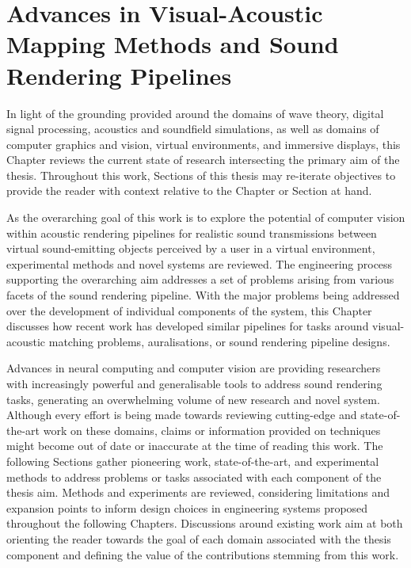 \chapter{Advances in Visual-Acoustic Mapping Methods and Sound Rendering Pipelines}\label{ch:litReview}%
In light of the grounding provided around the domains of wave theory, digital signal processing, acoustics and soundfield simulations, as well as domains of computer graphics and vision, virtual environments, and immersive displays, this Chapter reviews the current state of research intersecting the primary aim of the thesis. Throughout this work, Sections of this thesis may re-iterate objectives to provide the reader with context relative to the Chapter or Section at hand.\par
As the overarching goal of this work is to explore the potential of computer vision within acoustic rendering pipelines for realistic sound transmissions between virtual sound-emitting objects perceived by a user in a virtual environment, experimental methods and novel systems are reviewed. The engineering process supporting the overarching aim addresses a set of problems arising from various facets of the sound rendering pipeline. With the major problems being addressed over the development of individual components of the system, this Chapter discusses how recent work has developed similar pipelines for tasks around visual-acoustic matching problems, auralisations, or sound rendering pipeline designs.\par
Advances in neural computing and computer vision are providing researchers with increasingly powerful and generalisable tools to address sound rendering tasks, generating an overwhelming volume of new research and novel system. Although every effort is being made towards reviewing cutting-edge and state-of-the-art work on these domains, claims or information provided on techniques might become out of date or inaccurate at the time of reading this work. The following Sections gather pioneering work, state-of-the-art, and experimental methods to address problems or tasks associated with each component of the thesis aim. Methods and experiments are reviewed, considering limitations and expansion points to inform design choices in engineering systems proposed throughout the following Chapters. Discussions around existing work aim at both orienting the reader towards the goal of each domain associated with the thesis component and defining the value of the contributions stemming from this work.\par


